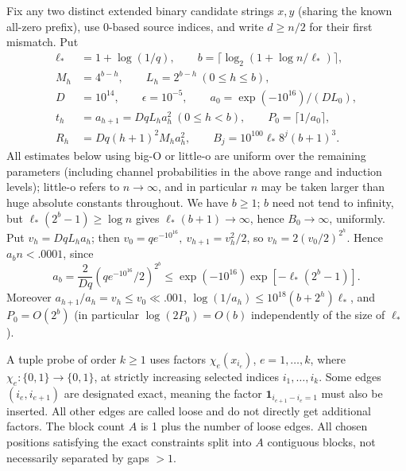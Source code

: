 \documentclass[11pt]{article}
\begin{document}
Fix any two distinct extended binary candidate strings \(x,y\) (sharing the known all-zero prefix), use \(0\)-based source indices, and write \(d\ge n/2\) for their first mismatch. Put
\[
\begin{split}
\ell_*&=1+\log(1/q),\qquad b=\lceil\log_2(1+\log n/\ell_*)\rceil,\\
M_h&=4^{b-h},\qquad L_h=2^{b-h}\ (0\le h\le b),\\
D&=10^{14},\qquad \epsilon=10^{-5},\qquad a_0=\exp(-10^{16})/(D L_0),\\
t_h&=a_{h+1}=D q L_h a_h^2\ (0\le h<b),\qquad P_0=\lceil 1/a_0\rceil,\\
R_h&=D q(h+1)^2 M_h a_h^2,\qquad B_j=10^{100}\ell_*8^j(b+1)^3 .
\end{split}
\]
All estimates below using big-O or little-o are uniform over the remaining
parameters (including channel probabilities in the above range and induction
levels); little-o refers to \(n\to\infty\), and in particular \(n\) may be
taken larger than huge absolute constants throughout. We have \(b\ge1\);
\(b\) need not tend to infinity, but \(\ell_*(2^b-1)\ge\log n\) gives
\(\ell_*(b+1)\to\infty\), hence \(B_0\to\infty\), uniformly. Put \(v_h=D q L_h a_h\);
then \(v_0=q e^{-10^{16}},\ v_{h+1}=v_h^2/2\), so \(v_h=2(v_0/2)^{2^h}\).
Hence \(a_b n<.0001\), since
\[
 a_b=\frac{2}{D q}(q e^{-10^{16}}/2)^{2^b}
 \le \exp(-10^{16})\exp[-\ell_*(2^b-1)].
\]
Moreover \(a_{h+1}/a_h=v_h\le v_0\ll .001\),
\(\log(1/a_h)\le10^{18}(b+2^h)\ell_*\), and \(P_0=O(2^b)\)
(in particular \(\log(2P_0)=O(b)\) independently of the size of \(\ell_*\)).

A tuple probe of order \(k\ge1\) uses factors \(\chi_e(x_{i_e})\), \(e=1,\ldots,k\), where \(\chi_e:\{0,1\}\to\{0,1\}\), at strictly increasing selected indices \(i_1,\ldots,i_k\). Some edges \((i_e,i_{e+1})\) are designated exact, meaning the factor \(\mathbf{1}_{i_{e+1}-i_e=1}\) must also be inserted. All other edges are called loose and do not directly get additional factors. The block count \(A\) is 1 plus the number of loose edges. All chosen positions satisfying the exact constraints split into \(A\) contiguous blocks, not necessarily separated by gaps \(>1\).
\end{document}
